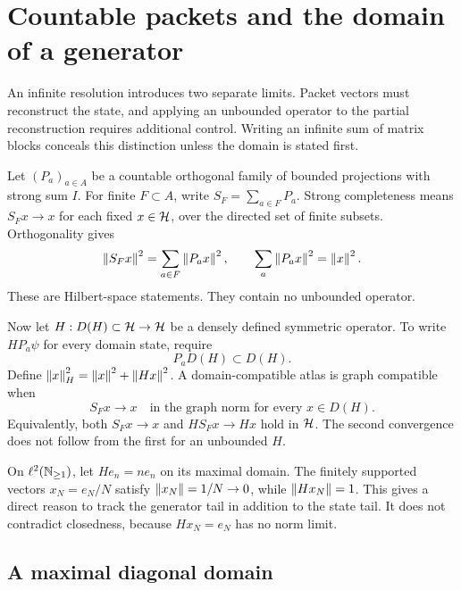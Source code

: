 \clearpage
\section{Countable packets and the domain of a generator}
\label{sec:foundation-domains}

An infinite resolution introduces two separate limits. Packet vectors must reconstruct the state, and applying an unbounded operator to the partial reconstruction requires additional control. Writing an infinite sum of matrix blocks conceals this distinction unless the domain is stated first.

Let $(P_a)_{a\in A}$ be a countable orthogonal family of bounded projections with strong sum $I$. For finite $F\subset A$, write $S_F=\sum_{a\in F}P_a$. Strong completeness means $S_Fx\to x$ for each fixed $x\in\mathcal H$, over the directed set of finite subsets. Orthogonality gives
\[
 \left\lVert S_Fx\right\rVert^2=\sum_{a\in F}\left\lVert P_ax\right\rVert^2,\qquad
 \sum_a\left\lVert P_ax\right\rVert^2=\left\lVert x\right\rVert^2.
\]
These are Hilbert-space statements. They contain no unbounded operator.

Now let $H:D(H)\subset\mathcal H\to\mathcal H$ be a densely defined symmetric operator. To write $HP_a\psi$ for every domain state, require
\begin{equation}
 P_aD(H)\subset D(H).
 \label{eq:foundation-domain-preserve}
\end{equation}
Define $\left\lVert x\right\rVert_H^2=\left\lVert x\right\rVert^2+\left\lVert Hx\right\rVert^2$. A domain-compatible atlas is graph compatible when
\begin{equation}
 S_Fx\longrightarrow x\quad\text{in the graph norm for every }x\in D(H).
 \label{eq:foundation-graph-compatible}
\end{equation}
Equivalently, both $S_Fx\to x$ and $HS_Fx\to Hx$ hold in $\mathcal H$. The second convergence does not follow from the first for an unbounded $H$.

\begin{example}
On $\ell^2(\mathbb N_{\geq1})$, let $He_n=ne_n$ on its maximal domain. The finitely supported vectors $x_N=e_N/N$ satisfy $\left\lVert x_N\right\rVert=1/N\to0$, while $\left\lVert Hx_N\right\rVert=1$. This gives a direct reason to track the generator tail in addition to the state tail. It does not contradict closedness, because $Hx_N=e_N$ has no norm limit.
\end{example}

\subsection{A maximal diagonal domain}

